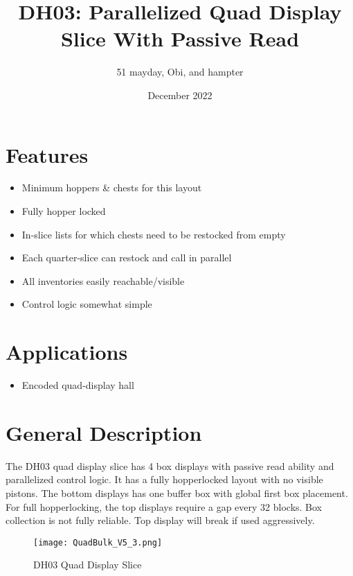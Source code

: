 \documentclass[10pt]{datasheet}
\title{DH03: Parallelized Quad Display Slice With Passive Read}
\author{51 mayday, Obi, and hampter}
\date{December 2022}
\begin{document}
\maketitle

\section{Features}

\begin{itemize}
\item{Minimum hoppers \& chests for this layout}
\item{Fully hopper locked}
\item{In-slice lists for which chests need to be restocked from empty}
\item{Each quarter-slice can restock and call in parallel}
\item{All inventories easily reachable/visible}
\item{Control logic somewhat simple}
\end{itemize}

\section{Applications}

\begin{itemize}
\item{Encoded quad-display hall}
\end{itemize}

\section{General Description}
The DH03 quad display slice has 4 box displays with passive read ability and parallelized control logic. It has a fully hopperlocked layout with no visible pistons. The bottom displays has one buffer box with global first box placement. For full hopperlocking, the top displays require a gap every 32 blocks. Box collection is not fully reliable. Top display will break if used aggressively.
\vfill\break

\begin{figure}[h]
    \centering
    \texttt{[image: QuadBulk\_V5\_3.png]}
    \caption{\centering DH03 Quad Display Slice}
\end{figure}

\onecolumn
\end{document}
